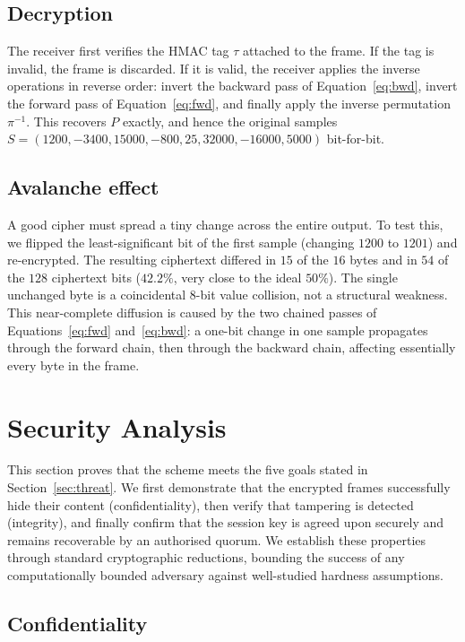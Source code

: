 \documentclass[pdflatex,sn-mathphys-num]{sn-jnl}%
\theoremstyle{thmstyleone}%
\theoremstyle{thmstyletwo}%
\theoremstyle{thmstylethree}%
\begin{document}
\subsection{Decryption}

The receiver first verifies the HMAC tag $\tau$ attached to the frame. If the tag is invalid, the frame is discarded. If it is valid, the receiver applies the inverse operations in reverse order: invert the backward pass of Equation~\eqref{eq:bwd}, invert the forward pass of Equation~\eqref{eq:fwd}, and finally apply the inverse permutation $\pi^{-1}$. This recovers $P$ exactly, and hence the original samples $S=(1200,-3400,15000,-800,25,32000,-16000,5000)$ bit-for-bit.

\subsection{Avalanche effect}

A good cipher must spread a tiny change across the entire output. To test this, we flipped the least-significant bit of the first sample (changing $1200$ to $1201$) and re-encrypted. The resulting ciphertext differed in $15$ of the $16$ bytes and in $54$ of the $128$ ciphertext bits ($42.2\%$, very close to the ideal $50\%$). The single unchanged byte is a coincidental $8$-bit value collision, not a structural weakness. This near-complete diffusion is caused by the two chained passes of Equations~\eqref{eq:fwd} and~\eqref{eq:bwd}: a one-bit change in one sample propagates through the forward chain, then through the backward chain, affecting essentially every byte in the frame.

\section{Security Analysis}
\label{sec:security}

This section proves that the scheme meets the five goals stated in Section~\ref{sec:threat}. We first demonstrate that the encrypted frames successfully hide their content (confidentiality), then verify that tampering is detected (integrity), and finally confirm that the session key is agreed upon securely and remains recoverable by an authorised quorum. We establish these properties through standard cryptographic reductions, bounding the success of any computationally bounded adversary against well-studied hardness assumptions.

\subsection{Confidentiality}
\end{document}

